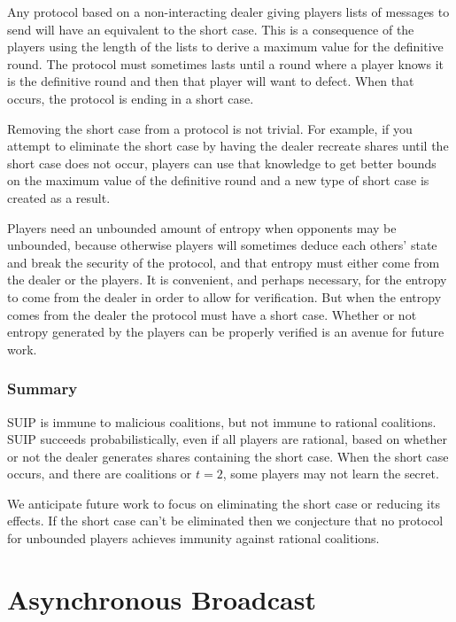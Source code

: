 \documentclass{dalcsthesis}
\begin{document}
Any protocol based on a non-interacting dealer giving players lists of messages to send will have an equivalent to the short case. This is a consequence of the players using the length of the lists to derive a maximum value for the definitive round. The protocol must sometimes lasts until a round where a player knows it is the definitive round and then that player will want to defect. When that occurs, the protocol is ending in a short case.

Removing the short case from a protocol is not trivial. For example, if you attempt to eliminate the short case by having the dealer recreate shares until the short case does not occur, players can use that knowledge to get better bounds on the maximum value of the definitive round and a new type of short case is created as a result.

Players need an unbounded amount of entropy when opponents may be unbounded, because otherwise players will sometimes deduce each others' state and break the security of the protocol, and that entropy must either come from the dealer or the players. It is convenient, and perhaps necessary, for the entropy to come from the dealer in order to allow for verification. But when the entropy comes from the dealer the protocol must have a short case. Whether or not entropy generated by the players can be properly verified is an avenue for future work.


\subsection{Summary}

SUIP is immune to malicious coalitions, but not immune to rational coalitions. SUIP succeeds probabilistically, even if all players are rational, based on whether or not the dealer generates shares containing the short case. When the short case occurs, and there are coalitions or $t=2$, some players may not learn the secret.

We anticipate future work to focus on eliminating the short case or reducing its effects. If the short case can't be eliminated then we conjecture that no protocol for unbounded players achieves immunity against rational coalitions.





\chapter{Asynchronous Broadcast}
\end{document}

